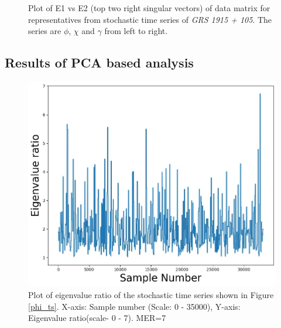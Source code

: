 \documentclass[10pt,conference]{IEEEtran}
\begin{document}
\begin{figure}
   \centering
\caption{Plot of E1 vs E2 (top two right singular vectors) of data matrix for  representatives from  stochastic time series  of \textit{GRS 1915 + 105}. The series are $\phi$, $\chi$ and $\gamma$ from left to right.}
   \label{svd_e1e2_stochastic}
\end{figure}


\subsection{Results of PCA based analysis}

\begin{figure}[ht]
\centering
\includegraphics[width=1\linewidth]{sac_ascf_phi_eig.jpg}
\caption{Plot of eigenvalue ratio of the stochastic time series shown in Figure \ref{phi_ts}. X-axis: Sample number (Scale: 0 - 35000), Y-axis: Eigenvalue ratio(scale- 0 - 7). MER=7}
\label{phi_eig}
\end{figure}
\end{document}
